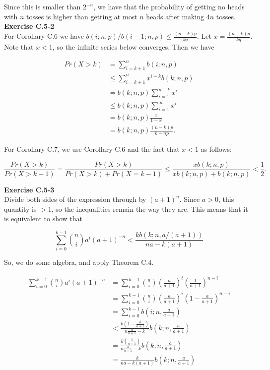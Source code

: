 \documentclass{article}
\begin{document}
Since this is smaller than $2^{-n}$, we have that the probability of getting no heads with $n$ tosses is higher than getting at most $n$ heads after making $4n$ tosses.\\

\noindent\textbf{Exercise C.5-2}\\

For Corollary C.6 we have $b(i;n,p)/b(i-1;n,p) \leq \frac{(n-k)p}{kq}$.  Let $x = \frac{(n-k)p}{kq}$.  Note that $x < 1$, so the infinite series below converges. Then we have

\begin{align*}
Pr(X > k) &= \sum_{i=k+1}^n b(i;n,p) \\
&\leq \sum_{i=k+1}^n x^{i-k}b(k;n,p) \\
&= b(k;n,p) \sum_{i=1}^{n-k} x^i \\
&\leq b(k;n,p) \sum_{i=1}^\infty x^i \\
&= b(k;n,p) \frac{x}{1-x} \\
&= b(k;n,p) \frac{(n-k)p}{k-np}.
\end{align*}

For Corollary C.7, we use Corollary C.6 and the fact that $x < 1$ as follows:

\[ \frac{Pr(X > k)}{Pr(X>k-1)} = \frac{Pr(X>k)}{Pr(X>k)+Pr(X=k-1)} \leq \frac{xb(k;n,p)}{xb(k;n,p) + b(k;n,p)}  < \frac{1}{2}.\]

\noindent\textbf{Exercise C.5-3}\\

Divide both sides of the expression through by $(a+1)^n$. Since $a>0$, this quantity is $>1$, so the inequalities remain the way they are. This means that it is equivalent to show that

\[
\sum_{i=0}^{k-1} \binom{n}{i} a^i (a+1)^{-n} < \frac{kb(k;n,a/(a+1))}{na - k(a+1)}
\]

So, we do some algebra, and apply Theorem C.4.

\begin{align*}
\sum_{i=0}^{k-1} \binom{n}{i} a^i (a+1)^{-n} & = \sum_{i=0}^{k-1}\binom{n}{i} \left(\frac{a}{a+1}\right)^i \left( \frac{1}{a+1}\right)^{n-i}\\
&= \sum_{i=0}^{k-1}\binom{n}{i} \left(\frac{a}{a+1}\right)^i \left(1 - \frac{a}{a+1}\right)^{n-i}\\
&= \sum_{i=0}^{k-1}b(i;n,\frac{a}{a+1})\\
&< \frac{k\left(1-\frac{a}{a+1}\right)}{n \frac{a}{a+1} - k}b(k;n,\frac{a}{a+1})\\
&= \frac{k\left(\frac{1}{a+1}\right)}{n \frac{a}{a+1} - k}b(k;n,\frac{a}{a+1})\\
&= \frac{k}{n a - k(a+1)}b(k;n,\frac{a}{a+1})
\end{align*}
\end{document}
